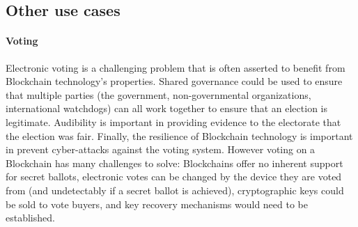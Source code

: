 


\subsection{Other use cases}

\paragraph{Voting}
Electronic voting is a challenging problem that is often asserted to benefit from Blockchain technology's properties.
Shared governance could be used to ensure that multiple parties (the government, non-governmental organizations, international watchdogs) can all work together to ensure that an election is legitimate.
Audibility is important in providing evidence to the electorate that the election was fair.
Finally, the resilience of Blockchain technology is important in prevent cyber-attacks against the voting system.
However voting on a Blockchain has many challenges to solve: Blockchains offer no inherent support for secret ballots, electronic votes can be changed by the device they are voted from (and undetectably if a secret ballot is achieved), cryptographic keys could be sold to vote buyers, and key recovery mechanisms would need to be established. 

